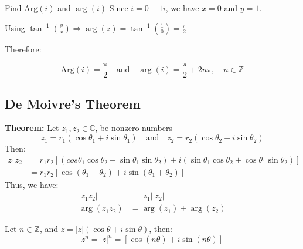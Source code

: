 \documentclass[a4paper, 10pt]{article}
\begin{document}
\begin{examplebox}{Find $\text{Arg}(i)$ and $\arg(i)$}{}
  Since $i = 0 + 1i$, we have $x = 0$ and $y = 1$.

  Using $\tan^{-1}\left(\frac{y}{x}\right) \Rightarrow \arg(z) = \tan^{-1}\left(\frac{1}{0}\right) = \frac{\pi}{2}$


  Therefore:

  $$ \text{Arg}(i) = \frac{\pi}{2} \quad \text{and} \quad \arg(i) = \frac{\pi}{2} + 2n\pi, \quad n \in \mathbb{Z} $$
\end{examplebox}

\subsection{De Moivre's Theorem}
\textbf{Theorem:} Let $z_1,z_2 \in \mathbb{C}$, be nonzero numbers
$$z_1 = r_1(\cos\theta_1 + i\sin\theta_1) \quad \text{and} \quad z_2 = r_2(\cos\theta_2 + i\sin\theta_2)$$
Then:
\begin{align*}
  z_1z_2 & = r_1r_2[(cos\theta_1\cos\theta_2  + \sin\theta_1\sin\theta_2) + i(\sin\theta_1\cos\theta_2 + \cos\theta_1\sin\theta_2)] \\
         & = r_1r_2[\cos(\theta_1 + \theta_2) + i\sin(\theta_1 + \theta_2)]
\end{align*}
Thus, we have:
\begin{align*}
  |z_1z_2|     & = |z_1||z_2|            \\
  \arg(z_1z_2) & = \arg(z_1) + \arg(z_2)
\end{align*}

\begin{theorembox}
  Let $n \in \mathbb{Z}$, and $z = |z|(\cos\theta + i\sin\theta)$, then:
  $$z^n = |z|^n = [\cos(n\theta) + i\sin(n\theta)]$$
\end{theorembox}
\end{document}
